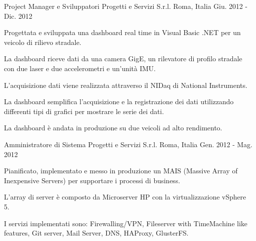 \begin{cventries}
  \cventry
    {Project Manager e Sviluppatori} %
    {Progetti e Servizi S.r.l.} %
    {Roma, Italia} %
    {Giu. 2012 - Dic. 2012} %
    {
      \begin{cvitems} %
        \item {Progettata e sviluppata una dashboard real time in Visual Basic .NET per un veicolo di rilievo stradale.}
        \item {La dashboard riceve dati da una camera GigE, un rilevatore di profilo stradale con due laser e due accelerometri e un'unità IMU.}
        \item {L'acquisizione dati viene realizzata attraverso il NIDaq di National Instruments.}
        \item {La dashboard semplifica l'acquisizione e la registrazione dei dati utilizzando differenti tipi di grafici per mostrare le serie dei dati.}
        \item {La dashboard è andata in produzione su due veicoli ad alto rendimento.}
      \end{cvitems}
    }

  \cventry
    {Amministratore di Sistema} %
    {Progetti e Servizi S.r.l.} %
    {Roma, Italia} %
    {Gen. 2012 - Mag. 2012} %
    {
      \begin{cvitems} %
        \item {Pianificato, implementato e messo in produzione un MAIS (Massive Array of Inexpensive Servers) per supportare i processi di business.}
        \item {L'array di server è composto da Microserver HP con la virtualizzazione vSphere 5.}
        \item {I servizi implementati sono: Firewalling/VPN, Fileserver with TimeMachine like features, Git server, Mail Server, DNS, HAProxy, GlusterFS.}
      \end{cvitems}
    }


\end{cventries}
